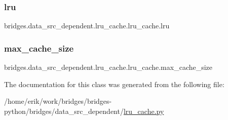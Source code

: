 \subsubsection{\texorpdfstring{lru}{lru}}
{\footnotesize\ttfamily bridges.\+data\+\_\+src\+\_\+dependent.\+lru\+\_\+cache.\+lru\+\_\+cache.\+lru}

\mbox{\label{classbridges_1_1data__src__dependent_1_1lru__cache_1_1lru__cache_a87a170ed62886de32e1bbf0d9ac05cfd}} 
\subsubsection{\texorpdfstring{max\+\_\+cache\+\_\+size}{max\_cache\_size}}
{\footnotesize\ttfamily bridges.\+data\+\_\+src\+\_\+dependent.\+lru\+\_\+cache.\+lru\+\_\+cache.\+max\+\_\+cache\+\_\+size}



The documentation for this class was generated from the following file\+:\begin{DoxyCompactItemize}
\item 
/home/erik/work/bridges/bridges-\/python/bridges/data\+\_\+src\+\_\+dependent/\hyperlink{lru__cache_8py}{lru\+\_\+cache.\+py}\end{DoxyCompactItemize}
